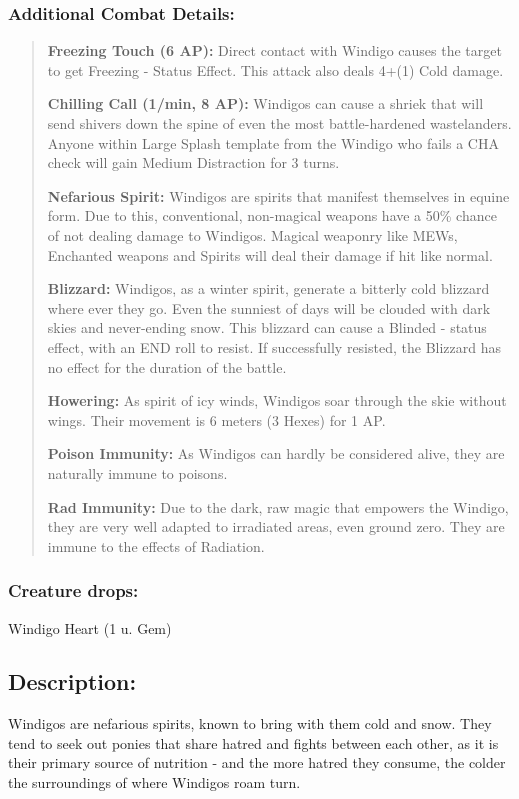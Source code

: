 \documentclass[11pt,a4paper,twocolumn]{book}
\begin{document}
	\subsubsection*{Additional Combat Details:}
	\begin{verse}
		\textbf{Freezing Touch (6 AP):} Direct contact with Windigo causes the target to get Freezing - Status Effect. This attack also deals 4+(1) Cold damage.
		
		\textbf{Chilling Call (1/min, 8 AP):} Windigos can cause a shriek that will send shivers down the spine of even the most battle-hardened wastelanders. Anyone within Large Splash template from the Windigo who fails a CHA check will gain Medium Distraction for 3 turns.
		
		\textbf{Nefarious Spirit:} Windigos are spirits that manifest themselves in equine form. Due to this, conventional, non-magical weapons have a 50\% chance of not dealing damage to Windigos. Magical weaponry like MEWs, Enchanted weapons and Spirits will deal their damage if hit like normal. 
		
		\textbf{Blizzard:} Windigos, as a winter spirit, generate a bitterly cold blizzard where ever they go. Even the sunniest of days will be clouded with dark skies and never-ending snow. This blizzard can cause a Blinded - status effect, with an END roll to resist. If successfully resisted, the Blizzard has no effect for the duration of the battle.
		
		\textbf{Howering:} As spirit of icy winds, Windigos soar through the skie without wings. Their movement is 6 meters (3 Hexes) for 1 AP.
		
		\textbf{Poison Immunity:} As Windigos can hardly be considered alive, they are naturally immune to poisons.
		
		\textbf{Rad Immunity:} Due to the dark, raw magic that empowers the Windigo, they are very well adapted to irradiated areas, even ground zero. They are immune to the effects of Radiation.
	\end{verse}
	
	\subsubsection*{Creature drops:}
	Windigo Heart (1 u. Gem)
	
	\subsection*{Description:}
	Windigos are nefarious spirits, known to bring with them cold and snow. They tend to seek out ponies that share hatred and fights between each other, as it is their primary source of nutrition - and the more hatred they consume, the colder the surroundings of where Windigos roam turn.
	
\end{document}
